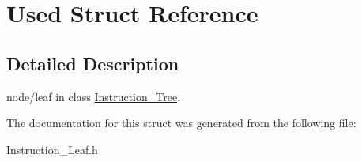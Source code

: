\hypertarget{structUsed}{
\section{Used Struct Reference}
\label{structUsed}
}


\subsection{Detailed Description}
node/leaf in class \hyperlink{classInstruction__Tree}{Instruction\_\-Tree}. 

The documentation for this struct was generated from the following file:\begin{DoxyCompactItemize}
\item 
Instruction\_\-Leaf.h\end{DoxyCompactItemize}
